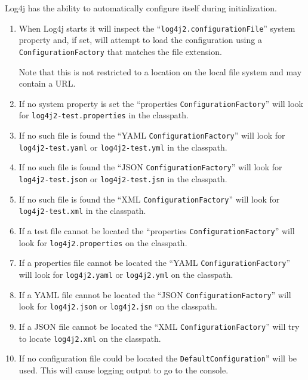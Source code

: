 \documentclass[11pt,a4paper, titlepage, parskip=half, headsepline, footsepline, cleardoublepage=current, headheight=1cm]{scrbook}
\begin{document}
Log4j has the ability to automatically configure itself during initialization. 
\begin{enumerate}
\item{When Log4j starts it will inspect the “\verb#log4j2.configurationFile#” system property and, if set, will attempt to load the configuration using a \lstinline|ConfigurationFactory| that matches the file extension.

Note that this is not restricted to a location on the local file system and may contain a URL.}
\item{If no system property is set the “properties \lstinline|ConfigurationFactory|” will look for \verb#log4j2-test.properties# in the classpath.}
\item{If no such file is found the “YAML \lstinline|ConfigurationFactory|” will look for \verb#log4j2-test.yaml# or \verb#log4j2-test.yml# in the classpath.}
\item{If no such file is found the “JSON \lstinline|ConfigurationFactory|” will look for \verb#log4j2-test.json# or \verb#log4j2-test.jsn# in the classpath.}
\item{If no such file is found the “XML \lstinline|ConfigurationFactory|” will look for \verb#log4j2-test.xml# in the classpath.}
\item{If a test file cannot be located the “properties \lstinline|ConfigurationFactory|” will look for \verb#log4j2.properties# on the classpath.}
\item{If a properties file cannot be located the “YAML \lstinline|ConfigurationFactory|” will look for \verb#log4j2.yaml# or \verb#log4j2.yml# on the classpath.}
\item{If a YAML file cannot be located the “JSON \lstinline|ConfigurationFactory|” will look for \verb#log4j2.json# or \verb#log4j2.jsn# on the classpath.}
\item{If a JSON file cannot be located the “XML \lstinline|ConfigurationFactory|” will try to locate \verb#log4j2.xml# on the classpath.}
\item{If no configuration file could be located the \lstinline|DefaultConfiguration|” will be used. This will cause logging output to go to the console.}
\end{enumerate}
\end{document}
